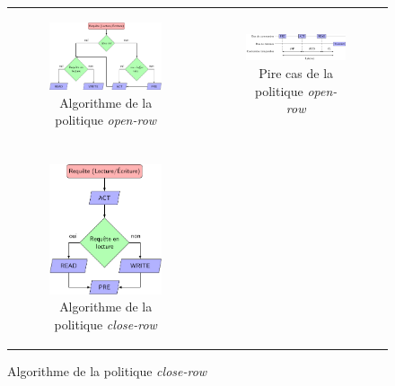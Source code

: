 \begin{figure}[!h]
	\centering
	\begin{tabular} {c c}
		\begin{subfigure}[t]{0,4\linewidth}
			\centering
			\includegraphics[width=0.8\linewidth]{graphics/figures/open_row_policy_algo2.pdf}
			\caption{\label{fig:open_row_algo}Algorithme de la politique \emph{open-row}}
		\end{subfigure} & 
		
		\begin{subfigure}[t]{0,5\linewidth}
			\includegraphics[width=\linewidth]{graphics/figures/open_row_policy_wcet2.pdf}
			\caption{\label{fig:open_row_wcet}Pire cas de la politique \emph{open-row}}
		\end{subfigure} \\
		& \\
		\begin{subfigure}[t]{0,3\linewidth}
			\centering
			\includegraphics[width=0.6\linewidth]{graphics/figures/close_row_policy_algo2.pdf}
			\caption{\label{fig:closed_row_algo}Algorithme de la politique \emph{close-row}}
		\end{subfigure} &
		

\end{tabular}
\end{figure}
